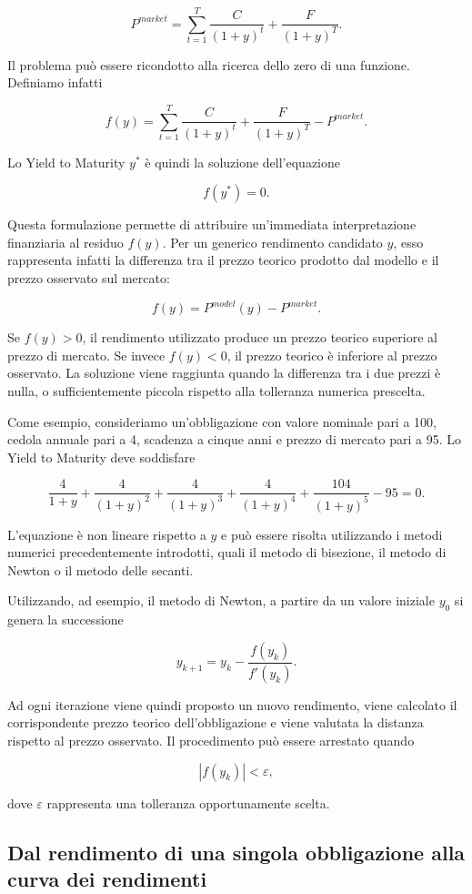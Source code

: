 \[
P^{market} =
\sum_{t=1}^{T}
\frac{C}{(1+y)^t}
+
\frac{F}{(1+y)^T}.
\]

Il problema può essere ricondotto alla ricerca dello zero di una funzione. Definiamo infatti

\[
f(y)=
\sum_{t=1}^{T}
\frac{C}{(1+y)^t}
+
\frac{F}{(1+y)^T}
-
P^{market}.
\]

Lo Yield to Maturity $y^*$ è quindi la soluzione dell'equazione

\[
f(y^*)=0.
\]

Questa formulazione permette di attribuire un'immediata interpretazione finanziaria al residuo $f(y)$. Per un generico rendimento candidato $y$, esso rappresenta infatti la differenza tra il prezzo teorico prodotto dal modello e il prezzo osservato sul mercato:

\[
f(y)=P^{model}(y)-P^{market}.
\]

Se $f(y)>0$, il rendimento utilizzato produce un prezzo teorico superiore al prezzo di mercato. Se invece $f(y)<0$, il prezzo teorico è inferiore al prezzo osservato. La soluzione viene raggiunta quando la differenza tra i due prezzi è nulla, o sufficientemente piccola rispetto alla tolleranza numerica prescelta.

Come esempio, consideriamo un'obbligazione con valore nominale pari a 100, cedola annuale pari a 4, scadenza a cinque anni e prezzo di mercato pari a 95. Lo Yield to Maturity deve soddisfare

\[
\frac{4}{1+y}
+
\frac{4}{(1+y)^2}
+
\frac{4}{(1+y)^3}
+
\frac{4}{(1+y)^4}
+
\frac{104}{(1+y)^5}
-
95
=0.
\]

L'equazione è non lineare rispetto a $y$ e può essere risolta utilizzando i metodi numerici precedentemente introdotti, quali il metodo di bisezione, il metodo di Newton o il metodo delle secanti.

Utilizzando, ad esempio, il metodo di Newton, a partire da un valore iniziale $y_0$ si genera la successione

\[
y_{k+1}
=
y_k-
\frac{f(y_k)}{f'(y_k)}.
\]

Ad ogni iterazione viene quindi proposto un nuovo rendimento, viene calcolato il corrispondente prezzo teorico dell'obbligazione e viene valutata la distanza rispetto al prezzo osservato. Il procedimento può essere arrestato quando

\[
|f(y_k)|<\varepsilon,
\]

dove $\varepsilon$ rappresenta una tolleranza opportunamente scelta.

\subsection{Dal rendimento di una singola obbligazione alla curva dei rendimenti}

